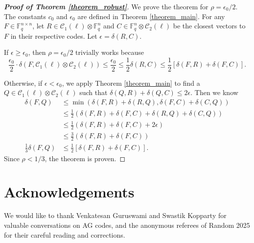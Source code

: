 \documentclass[11pt]{article}
\newcommand{\F}{\mathbb{F}}
\newcommand{\C}{\mathcal{C}}
\begin{document}
\begin{proof}[\textbf{Proof of Theorem \ref{theorem_robust}}]
We prove the theorem for $\rho = \epsilon_0/2$. The constants $c_0$ and $\epsilon_0$ are defined in Theorem \ref{theorem_main}. For any $F \in \F_q^{n \times n}$, let $R \in \C_1(\ell) \otimes \F_q^n$ and $C \in \F_q^n \otimes \C_2(\ell)$ be the closest vectors to $F$ in their respective codes. Let $\epsilon = \delta(R, C)$.

If $\epsilon \geq \epsilon_0$, then $\rho = \epsilon_0/2$ trivially works because
$$\frac{\epsilon_0}{2} \cdot \delta(F, \C_1(\ell) \otimes \C_2(\ell)) \leq \frac{\epsilon_0}{2} \leq \frac 12 \delta(R, C) \leq \frac 12 [\delta(F, R) + \delta(F, C)].$$

Otherwise, if $\epsilon < \epsilon_0$, we apply Theorem \ref{theorem_main} to find a $Q \in \C_1(\ell) \otimes \C_2(\ell)$ such that $\delta(Q, R) + \delta(Q, C) \leq 2 \epsilon$. Then we know
\begin{align*}
    \delta(F, Q) &\leq \min(\delta(F, R) + \delta(R, Q), \delta(F, C) + \delta(C, Q)) \\
    &\leq \frac 12 \left(\delta(F, R) + \delta(F, C) + \delta(R, Q) + \delta(C, Q)\right)\\
    &\leq \frac 12 \left(\delta(F, R) + \delta(F, C) + 2\epsilon\right)\\
    &\leq \frac 32 \left(\delta(F, R) + \delta(F, C)\right) \\
    \frac 13 \delta(F, Q) &\leq \frac 12 \left[\delta(F, R) + \delta(F, C)\right].
\end{align*}
Since $\rho < 1/3$, the theorem is proven.
\end{proof}
\section*{Acknowledgements}
We would like to thank Venkatesan Guruswami and Swastik Kopparty for valuable conversations on AG codes, and the anonymous referees of Random 2025 for their careful reading and corrections.



\end{document}
